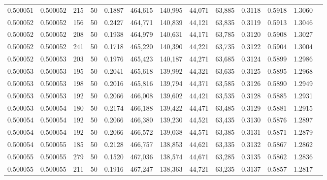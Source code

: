 \begin{tabular}{rrrrrrrrrrrrr}
0.500051 & 0.500052 &   215 &  50 &                                     0.1887 & 464,615 & 140,995 &  44,071 &  63,885 & 0.3118 & 0.5918 & 1.3060 \\
0.500052 & 0.500052 &   156 &  50 &                                     0.2427 & 464,771 & 140,839 &  44,121 &  63,835 & 0.3119 & 0.5913 & 1.3046 \\
0.500052 & 0.500052 &   208 &  50 &                                     0.1938 & 464,979 & 140,631 &  44,171 &  63,785 & 0.3120 & 0.5908 & 1.3027 \\
0.500052 & 0.500052 &   241 &  50 &                                     0.1718 & 465,220 & 140,390 &  44,221 &  63,735 & 0.3122 & 0.5904 & 1.3004 \\
0.500052 & 0.500053 &   203 &  50 &                                     0.1976 & 465,423 & 140,187 &  44,271 &  63,685 & 0.3124 & 0.5899 & 1.2986 \\
0.500053 & 0.500053 &   195 &  50 &                                     0.2041 & 465,618 & 139,992 &  44,321 &  63,635 & 0.3125 & 0.5895 & 1.2968 \\
0.500053 & 0.500053 &   198 &  50 &                                     0.2016 & 465,816 & 139,794 &  44,371 &  63,585 & 0.3126 & 0.5890 & 1.2949 \\
0.500053 & 0.500053 &   192 &  50 &                                     0.2066 & 466,008 & 139,602 &  44,421 &  63,535 & 0.3128 & 0.5885 & 1.2931 \\
0.500053 & 0.500054 &   180 &  50 &                                     0.2174 & 466,188 & 139,422 &  44,471 &  63,485 & 0.3129 & 0.5881 & 1.2915 \\
0.500054 & 0.500054 &   192 &  50 &                                     0.2066 & 466,380 & 139,230 &  44,521 &  63,435 & 0.3130 & 0.5876 & 1.2897 \\
0.500054 & 0.500054 &   192 &  50 &                                     0.2066 & 466,572 & 139,038 &  44,571 &  63,385 & 0.3131 & 0.5871 & 1.2879 \\
0.500054 & 0.500055 &   185 &  50 &                                     0.2128 & 466,757 & 138,853 &  44,621 &  63,335 & 0.3132 & 0.5867 & 1.2862 \\
0.500055 & 0.500055 &   279 &  50 &                                     0.1520 & 467,036 & 138,574 &  44,671 &  63,285 & 0.3135 & 0.5862 & 1.2836 \\
0.500055 & 0.500055 &   211 &  50 &                                     0.1916 & 467,247 & 138,363 &  44,721 &  63,235 & 0.3137 & 0.5857 & 1.2817 \\

\end{tabular}
